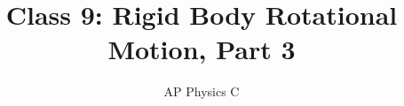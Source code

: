 \documentclass[12pt,compress,aspectratio=169]{beamer}
\title{Class 9: Rigid Body Rotational Motion, Part 3}
\subtitle{AP Physics C}
\begin{document}
\begin{frame}
  \maketitle
\end{frame}



%
%
%
%  
%
%
%
%  
%
%
%
%
%
%
%
\end{document}
